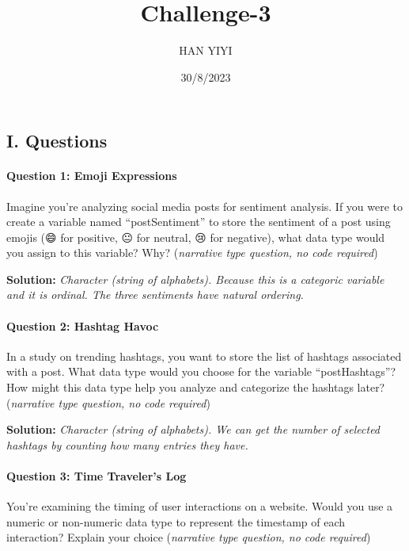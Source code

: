 \documentclass[
]{article}
\title{Challenge-3}
\author{HAN YIYI}
\date{30/8/2023}
\begin{document}
\maketitle

\hypertarget{i.-questions}{%
\subsection{I. Questions}\label{i.-questions}}

\hypertarget{question-1-emoji-expressions}{%
\paragraph{Question 1: Emoji
Expressions}\label{question-1-emoji-expressions}}

Imagine you're analyzing social media posts for sentiment analysis. If
you were to create a variable named ``postSentiment'' to store the
sentiment of a post using emojis (😄 for positive, 😐 for neutral, 😢
for negative), what data type would you assign to this variable? Why?
(\emph{narrative type question, no code required})

\textbf{Solution:} \emph{Character (string of alphabets). Because this
is a categoric variable and it is ordinal. The three sentiments have
natural ordering.}

\hypertarget{question-2-hashtag-havoc}{%
\paragraph{Question 2: Hashtag Havoc}\label{question-2-hashtag-havoc}}

In a study on trending hashtags, you want to store the list of hashtags
associated with a post. What data type would you choose for the variable
``postHashtags''? How might this data type help you analyze and
categorize the hashtags later? (\emph{narrative type question, no code
required})

\textbf{Solution:} \emph{Character (string of alphabets). We can get the
number of selected hashtags by counting how many entries they have. }

\hypertarget{question-3-time-travelers-log}{%
\paragraph{Question 3: Time Traveler's
Log}\label{question-3-time-travelers-log}}

You're examining the timing of user interactions on a website. Would you
use a numeric or non-numeric data type to represent the timestamp of
each interaction? Explain your choice (\emph{narrative type question, no
code required})
\end{document}
